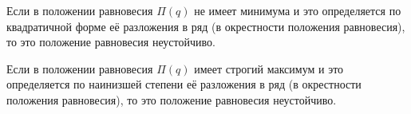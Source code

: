 \begin{to_thr}
    Если в положении равновесия $\Pi(q)$ не имеет минимума и это определяется по квадратичной форме её разложения в ряд (в окрестности положения равновесия), то это положение равновесия неустойчиво.     
\end{to_thr}


\begin{to_thr}
    Если в положении равновесия $\Pi(q)$  имеет строгий максимум и это определяется по наинизшей степени её разложения в ряд (в окрестности положения равновесия), то это положение равновесия неустойчиво.     
\end{to_thr}


